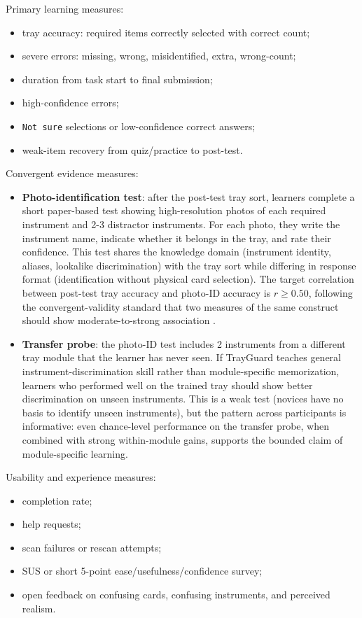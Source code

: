 \documentclass[10pt,a4paper]{article}
\begin{document}
Primary learning measures:
\begin{itemize}
  \item tray accuracy: required items correctly selected with correct count;
  \item severe errors: missing, wrong, misidentified, extra, wrong-count;
  \item duration from task start to final submission;
  \item high-confidence errors;
  \item \texttt{Not sure} selections or low-confidence correct answers;
  \item weak-item recovery from quiz/practice to post-test.
\end{itemize}
Convergent evidence measures:
\begin{itemize}
  \item \textbf{Photo-identification test}: after the post-test tray sort, learners
  complete a short paper-based test showing high-resolution photos of each
  required instrument and 2-3 distractor instruments. For each photo, they write
  the instrument name, indicate whether it belongs in the tray, and rate their
  confidence. This test shares the knowledge domain (instrument identity, aliases,
  lookalike discrimination) with the tray sort while differing in response format
  (identification without physical card selection). The target correlation
  between post-test tray accuracy and photo-ID accuracy is $r \ge 0.50$, following
  the convergent-validity standard that two measures of the same construct should
  show moderate-to-strong association \cite{messick-validity-1989, cook-beckman-validity-2006, downing-validity-2003}.
  \item \textbf{Transfer probe}: the photo-ID test includes 2 instruments from a
  different tray module that the learner has never seen. If TrayGuard teaches
  general instrument-discrimination skill rather than module-specific
  memorization, learners who performed well on the trained tray should show
  better discrimination on unseen instruments. This is a weak test
  (novices have no basis to identify unseen instruments), but the pattern across
  participants is informative: even chance-level performance on the transfer
  probe, when combined with strong within-module gains, supports the bounded
  claim of module-specific learning.
\end{itemize}
Usability and experience measures:
\begin{itemize}
  \item completion rate;
  \item help requests;
  \item scan failures or rescan attempts;
  \item SUS or short 5-point ease/usefulness/confidence survey;
  \item open feedback on confusing cards, confusing instruments, and perceived realism.
\end{itemize}
\end{document}
